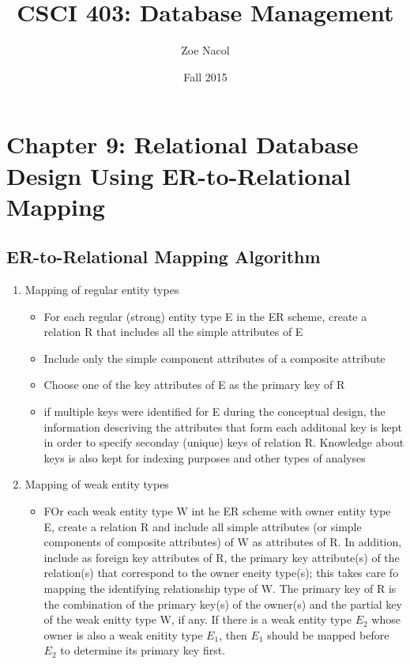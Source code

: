 \documentclass[12pt]{article}
\begin{document}
\author{Zoe Nacol}
\date{Fall 2015}
\title{CSCI 403: Database Management}
\maketitle
\section{Chapter 9: Relational Database Design Using ER-to-Relational Mapping}
	\subsection{ER-to-Relational Mapping Algorithm}
		\begin{enumerate}
			\item
				Mapping of regular entity types
				\begin{itemize}
					\item
						For each regular (strong) entity type E in the ER scheme, create a relation R that includes all the simple attributes of E
					\item
						Include only the simple component attributes of a composite attribute
					\item
						Choose one of the key attributes of E as the primary key of R
					\item
						if multiple keys were identified for E during the conceptual design, the information descriving the attributes that form each additonal key is kept in order to specify seconday (unique) keys of relation R. Knowledge about keys is also kept for indexing purposes and other types of analyses
				\end{itemize}
			\item
				Mapping of weak entity types
				\begin{itemize}
					\item
						FOr each weak entity type W int he ER scheme with owner entity type E, create a relation R and include all simple attributes (or simple components of composite attributes) of W as attributes of R. In addition, include as foreign key attributes of R, the primary key attribute(s) of the relation(s) that correspond to the owner eneity type(s); this takes care fo mapping the identifying relationship type of W. The primary key of R is the combination of the primary key(s) of the owner(s) and the partial key of the weak enitty type W, if any. If there is a weak entity type $E_2$ whose owner is also a weak enitity type $E_1$, then $E_1$ should be mapped before $E_2$ to determine its primary key first.

\end{itemize}
\end{enumerate}
\end{document}
